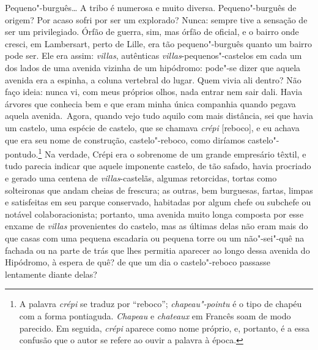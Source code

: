 Pequeno"-burguês\ldots{} A tribo é numerosa e muito diversa. Pequeno"-burguês
de origem? Por acaso sofri por ser um explorado? Nunca: sempre tive a
sensação de ser um privilegiado. Órfão de guerra, sim, mas órfão de
oficial, e o bairro onde cresci, em Lambersart, perto de Lille, era tão
pequeno"-burguês quanto um bairro pode ser. Ele era assim: \emph{villas},
autênticas \emph{villas}-pequenos"-castelos em cada um dos lados de uma
avenida vizinha de um hipódromo: pode"-se dizer que aquela avenida era a
espinha, a coluna vertebral do lugar. Quem vivia ali dentro? Não faço
ideia: nunca vi, com meus próprios olhos, nada entrar nem sair dali.
Havia árvores que conhecia bem e que eram minha única companhia quando
pegava aquela avenida.~Agora, quando vejo tudo aquilo com mais
distância, sei que havia um castelo, uma espécie de castelo, que se
chamava \emph{crépi} {[}reboco{]}, e eu achava que era seu nome de
construção, castelo"-reboco, como diríamos castelo"-pontudo.\footnote{A
  palavra \emph{crépi} se traduz por ``reboco''; \emph{chapeau"-pointu} é
  o tipo de chapéu com a forma pontiaguda. \emph{Chapeau} e
  \emph{chateaux} em Francês soam de modo parecido. Em seguida,
  \emph{crépi} aparece como nome próprio, e, portanto, é a essa confusão
  que o autor se refere ao ouvir a palavra à época.} Na verdade, Crépi
era o sobrenome de um grande empresário têxtil, e tudo parecia indicar
que aquele imponente castelo, de tão safado, havia procriado e gerado
uma centena de \emph{villas}-castelãs, algumas retorcidas, tortas como
solteironas que andam cheias de frescura; as outras, bem burguesas,
fartas, limpas e satisfeitas em seu parque conservado, habitadas por
algum chefe ou subchefe ou notável colaboracionista; portanto, uma avenida
muito longa composta por esse enxame de \emph{villas} provenientes do
castelo, mas as últimas delas não eram mais do que casas com uma pequena
escadaria ou pequena torre ou um não"-sei"-quê na fachada ou na parte de
trás que lhes permitia aparecer ao longo dessa avenida do Hipódromo, à
espera de quê? de que um dia o castelo"-reboco passasse lentamente diante
delas?

